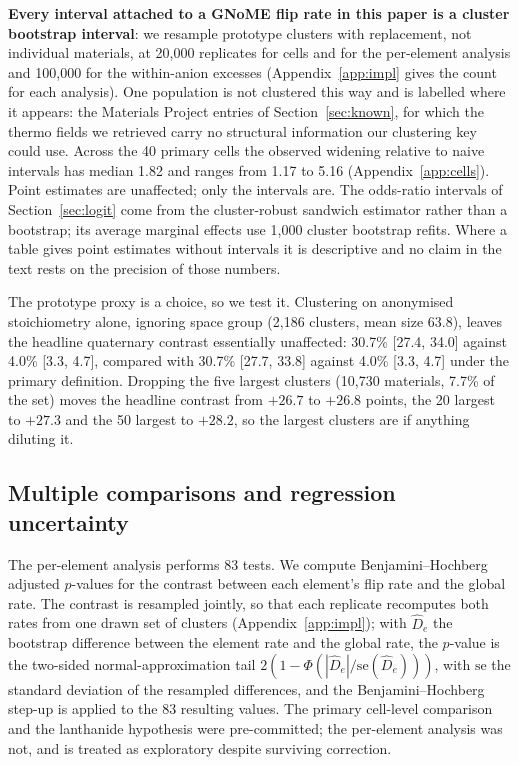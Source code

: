 \documentclass[11pt]{article}
\begin{document}
\textbf{Every interval attached to a GNoME flip rate in this paper is a cluster bootstrap
interval}: we resample prototype clusters with replacement, not individual materials, at
20{,}000 replicates for cells and for the per-element analysis and 100{,}000 for the
within-anion excesses (Appendix~\ref{app:impl} gives the count for each analysis). One
population is not clustered this way and is labelled where it appears: the Materials
Project entries of Section~\ref{sec:known}, for which the thermo fields we retrieved carry
no structural information our clustering key could use. Across the 40 primary cells the
observed widening relative to naive intervals has median 1.82 and ranges from 1.17 to
5.16 (Appendix~\ref{app:cells}). Point estimates are unaffected; only the intervals are. The odds-ratio intervals of
Section~\ref{sec:logit} come from the cluster-robust sandwich estimator rather than a
bootstrap; its average marginal effects use 1{,}000 cluster bootstrap refits. Where a table gives point estimates without intervals it is descriptive and no
claim in the text rests on the precision of those numbers.

The prototype proxy is a choice, so we test it. Clustering on anonymised stoichiometry
alone, ignoring space group (2{,}186 clusters, mean size 63.8), leaves the headline
quaternary contrast essentially unaffected: 30.7\% [27.4, 34.0] against 4.0\%
[3.3, 4.7], compared with 30.7\% [27.7, 33.8] against 4.0\% [3.3, 4.7] under the
primary definition. Dropping the five largest clusters (10{,}730 materials, 7.7\% of the
set) moves the headline contrast from $+26.7$ to $+26.8$ points, the 20 largest to
$+27.3$ and the 50 largest to $+28.2$, so the largest clusters are if anything diluting
it.

\subsection{Multiple comparisons and regression uncertainty}

The per-element analysis performs 83 tests. We compute Benjamini--Hochberg adjusted
$p$-values for the contrast between each element's flip rate and the global rate. The
contrast is resampled jointly, so that each replicate recomputes both rates from one
drawn set of clusters (Appendix~\ref{app:impl}); with $\hat D_e$ the bootstrap
difference between the element rate and the global rate, the $p$-value is the two-sided
normal-approximation tail $2\left(1-\Phi\!\left(|\hat D_e| / \mathrm{se}(\hat
D_e)\right)\right)$, with $\mathrm{se}$ the standard deviation of the resampled
differences, and the Benjamini--Hochberg step-up is applied to the 83 resulting values.
The primary cell-level comparison and the lanthanide hypothesis were pre-committed; the
per-element analysis was not, and is treated as exploratory despite surviving
correction.
\end{document}
